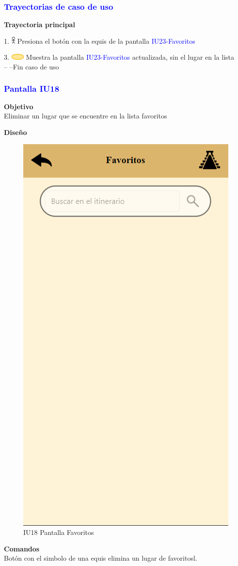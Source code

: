 \pagebreak
\subsubsection{\textcolor{blue}{Trayectorias de caso de uso}}
\textbf{Trayectoria principal}
    
    1. \includegraphics[width=0.0150\textwidth]{Figuras/persona.png} Presiona el botón con la equis de la pantalla \textcolor{blue}{IU23-Favoritos}

    3. \includegraphics[width=0.0500\textwidth]{Figuras/sistema.png} Muestra la pantalla \textcolor{blue}{IU23-Favoritos} actualizada, sin el lugar en la lista\\
    -- --Fin caso de uso\\
    
\subsubsection{\textcolor{blue}{Pantalla IU18}}

\textbf{Objetivo} \\
Eliminar un lugar que se encuentre en la lista favoritos

\textbf{Diseño}

    \begin{figure}[h]
        
            \centering
            \includegraphics[width=.4\linewidth]{entregable final/pantallasSistema/IU18 Pantalla Favoritos.png}
        \caption{IU18 Pantalla Favoritos}
    
    \end{figure}
\textbf{Comandos} \\
Botón con el simbolo de una equis elimina un lugar de favoritosl.

